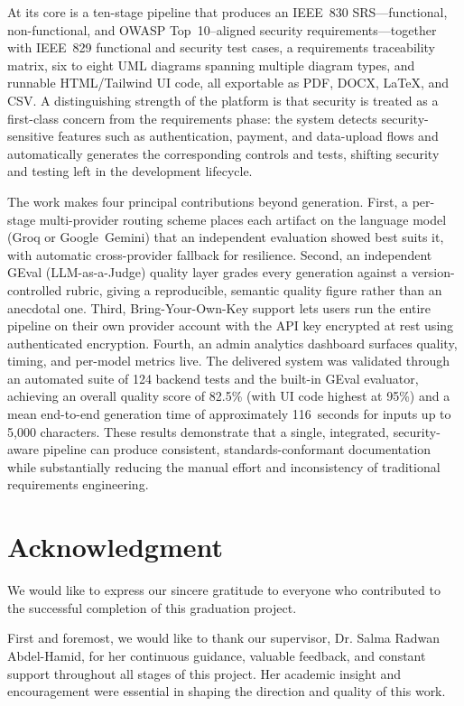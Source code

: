 \documentclass[12pt,a4paper,oneside]{report}
\begin{document}
At its core is a ten-stage pipeline that produces an IEEE~830 SRS---functional, non-functional, and OWASP Top~10--aligned security requirements---together with IEEE~829 functional and security test cases, a requirements traceability matrix, six to eight UML diagrams spanning multiple diagram types, and runnable HTML/Tailwind UI code, all exportable as PDF, DOCX, LaTeX, and CSV. A distinguishing strength of the platform is that security is treated as a first-class concern from the requirements phase: the system detects security-sensitive features such as authentication, payment, and data-upload flows and automatically generates the corresponding controls and tests, shifting security and testing left in the development lifecycle.

The work makes four principal contributions beyond generation. First, a per-stage multi-provider routing scheme places each artifact on the language model (Groq or Google~Gemini) that an independent evaluation showed best suits it, with automatic cross-provider fallback for resilience. Second, an independent GEval (LLM-as-a-Judge) quality layer grades every generation against a version-controlled rubric, giving a reproducible, semantic quality figure rather than an anecdotal one. Third, Bring-Your-Own-Key support lets users run the entire pipeline on their own provider account with the API key encrypted at rest using authenticated encryption. Fourth, an admin analytics dashboard surfaces quality, timing, and per-model metrics live. The delivered system was validated through an automated suite of 124 backend tests and the built-in GEval evaluator, achieving an overall quality score of 82.5\% (with UI code highest at 95\%) and a mean end-to-end generation time of approximately 116~seconds for inputs up to 5{,}000 characters. These results demonstrate that a single, integrated, security-aware pipeline can produce consistent, standards-conformant documentation while substantially reducing the manual effort and inconsistency of traditional requirements engineering.

\chapter*{Acknowledgment}
We would like to express our sincere gratitude to everyone who contributed to the successful completion of this graduation project.

First and foremost, we would like to thank our supervisor, Dr. Salma Radwan Abdel-Hamid, for her continuous guidance, valuable feedback, and constant support throughout all stages of this project. Her academic insight and encouragement were essential in shaping the direction and quality of this work.
\end{document}
